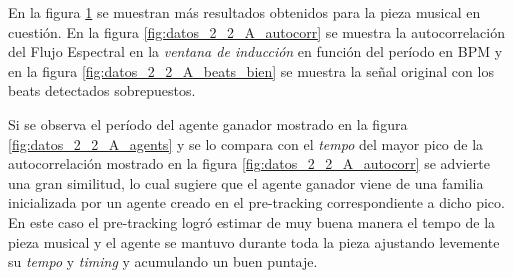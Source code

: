 \documentclass[12pt,a4paper,titlepage]{report}
\begin{document}
En la figura \ref{fig:datos_2_2_A} se muestran más resultados obtenidos para la pieza musical en cuestión. En la figura \ref{fig:datos_2_2_A_autocorr} se muestra la autocorrelación del Flujo Espectral en la \emph{ventana de inducción} en función del período en BPM y en la figura \ref{fig:datos_2_2_A_beats_bien} se muestra la señal original con los beats detectados sobrepuestos.\\

\begin{figure} [h!]
\centering
  \caption{}
  \label{fig:datos_2_2_A}
\end{figure}

Si se observa el período del agente ganador mostrado en la figura \ref{fig:datos_2_2_A_agents} y se lo compara con el \emph{tempo} del mayor pico de la autocorrelación mostrado en la figura \ref{fig:datos_2_2_A_autocorr} se advierte una gran similitud, lo cual sugiere que el agente ganador viene de una familia inicializada por un agente creado en el pre-tracking correspondiente a dicho pico. En este caso el pre-tracking logró estimar de muy buena manera el tempo de la pieza musical y el agente se mantuvo durante toda la pieza ajustando levemente su \emph{tempo} y \emph{timing} y acumulando un buen puntaje.\\
\end{document}
